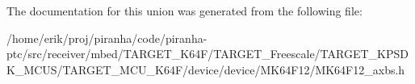 The documentation for this union was generated from the following file\+:\begin{DoxyCompactItemize}
\item 
/home/erik/proj/piranha/code/piranha-\/ptc/src/receiver/mbed/\+T\+A\+R\+G\+E\+T\+\_\+\+K64\+F/\+T\+A\+R\+G\+E\+T\+\_\+\+Freescale/\+T\+A\+R\+G\+E\+T\+\_\+\+K\+P\+S\+D\+K\+\_\+\+M\+C\+U\+S/\+T\+A\+R\+G\+E\+T\+\_\+\+M\+C\+U\+\_\+\+K64\+F/device/device/\+M\+K64\+F12/M\+K64\+F12\+\_\+axbs.\+h\end{DoxyCompactItemize}

